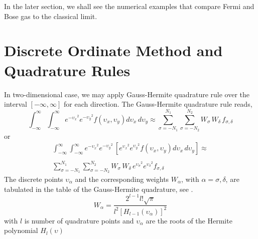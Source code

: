 \documentclass{rsproca}%
\begin{document}
In the later section, we shall see the numerical examples that compare Fermi and Bose gas to the classical limit.

\section{ Discrete Ordinate Method and Quadrature Rules}
\label{sec:3}
In two-dimensional case, we may apply Gauss-Hermite quadrature rule over the interval $[-\infty,\infty]$ for each direction.  The Gauss-Hermite quadrature rule reads,
\begin{equation}
\int^{\infty}_{-\infty}\int^{\infty}_{-\infty}{e^{-{\upsilon_x}^2}e^{-{\upsilon_y}^2}f(\upsilon_x,\upsilon_y)d\upsilon_x\,d\upsilon_y} \approx \sum^{N_1}_{\sigma=-N_1}\sum^{N_2}_{\sigma=-N_2}{W_\sigma\,W_\delta\, f_{\sigma,\delta}}
\end{equation}
or
\begin{eqnarray}
\int^{\infty}_{-\infty}\int^{\infty}_{-\infty}{e^{-{\upsilon_x}^2}e^{-{\upsilon_y}^2}\,[e^{{\upsilon_x}^2}e^{{\upsilon_y}^2}f(\upsilon_x,\upsilon_y) d\upsilon_x\,d\upsilon_y]} \approx \nonumber \\
\nonumber \\
\sum^{N_1}_{\sigma=-N_1}\sum^{N_2}_{\sigma=-N_2}{W_\sigma\,W_\delta\,e^{{\upsilon_\sigma}^2}e^{{\upsilon_\delta}^2}f_{\sigma,\delta}}
\end{eqnarray}
The discrete points $\upsilon_\alpha$ and the corresponding weights $W_\alpha$, with $\alpha=\sigma,\delta$, are tabulated in the table of the Gauss-Hermite quadrature, see \cite{abramowitz+stegun}.
\begin{equation}
W_\alpha = \frac{2^{l-1}l!\sqrt{\pi}}{l^2[H_{l-1}(\upsilon_\alpha)]^2}
\label{weightsgh}
\end{equation}
with $l$ is number of quadrature points and $\upsilon_\alpha$ are the roots of the Hermite polynomial \(H_l(\upsilon)\)
\end{document}

